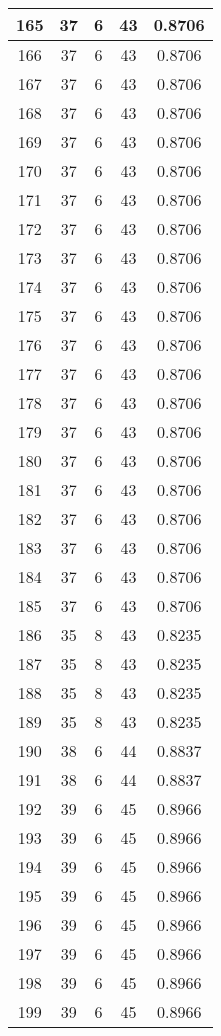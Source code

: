\documentclass[letterpaper, 12pt]{article}
\begin{document}
\begin{longtable}{|c|c|c|c|c|}
\hline
165 & 37 & 6 & 43 & 0.8706 \\
\hline
166 & 37 & 6 & 43 & 0.8706 \\
\hline
167 & 37 & 6 & 43 & 0.8706 \\
\hline
168 & 37 & 6 & 43 & 0.8706 \\
\hline
169 & 37 & 6 & 43 & 0.8706 \\
\hline
170 & 37 & 6 & 43 & 0.8706 \\
\hline
171 & 37 & 6 & 43 & 0.8706 \\
\hline
172 & 37 & 6 & 43 & 0.8706 \\
\hline
173 & 37 & 6 & 43 & 0.8706 \\
\hline
174 & 37 & 6 & 43 & 0.8706 \\
\hline
175 & 37 & 6 & 43 & 0.8706 \\
\hline
176 & 37 & 6 & 43 & 0.8706 \\
\hline
177 & 37 & 6 & 43 & 0.8706 \\
\hline
178 & 37 & 6 & 43 & 0.8706 \\
\hline
179 & 37 & 6 & 43 & 0.8706 \\
\hline
180 & 37 & 6 & 43 & 0.8706 \\
\hline
181 & 37 & 6 & 43 & 0.8706 \\
\hline
182 & 37 & 6 & 43 & 0.8706 \\
\hline
183 & 37 & 6 & 43 & 0.8706 \\
\hline
184 & 37 & 6 & 43 & 0.8706 \\
\hline
185 & 37 & 6 & 43 & 0.8706 \\
\hline
186 & 35 & 8 & 43 & 0.8235 \\
\hline
187 & 35 & 8 & 43 & 0.8235 \\
\hline
188 & 35 & 8 & 43 & 0.8235 \\
\hline
189 & 35 & 8 & 43 & 0.8235 \\
\hline
190 & 38 & 6 & 44 & 0.8837 \\
\hline
191 & 38 & 6 & 44 & 0.8837 \\
\hline
192 & 39 & 6 & 45 & 0.8966 \\
\hline
193 & 39 & 6 & 45 & 0.8966 \\
\hline
194 & 39 & 6 & 45 & 0.8966 \\
\hline
195 & 39 & 6 & 45 & 0.8966 \\
\hline
196 & 39 & 6 & 45 & 0.8966 \\
\hline
197 & 39 & 6 & 45 & 0.8966 \\
\hline
198 & 39 & 6 & 45 & 0.8966 \\
\hline
199 & 39 & 6 & 45 & 0.8966 \\
\hline
\end{longtable}
\end{document}
